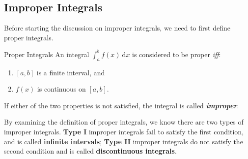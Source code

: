 \documentclass[12pt,a4paper]{article}
\def\d{{\mathrm{d}}}
\begin{document}
\subsection{Improper Integrals}\label{improper}
Before starting the discussion on improper integrals, we need to first define proper integrals.
\begin{df}{Proper Integrals}
	An integral $\displaystyle\int_a^bf(x)\ \d x$ is considered to be proper \textit{iff}: 
	\begin{enumerate}
		\item $\left[a, b\right]$ is a finite interval, and
		\item $f(x)$ is continuous on $\left[a, b\right]$.
	\end{enumerate}
	If either of the two properties is not satisfied, the integral is called \textbf{\textit{improper}}.
\end{df}
By examining the definition of proper integrals, we know there are two types of improper integrals. \textbf{Type I} improper integrals fail to satisfy the first condition, and is called \textbf{infinite intervals}; \textbf{Type II} improper integrals do not satisfy the second condition and is called \textbf{discontinuous integrals}.
\end{document}
